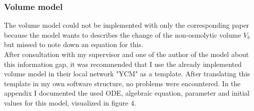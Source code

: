 \subsubsection{Volume model}
The volume model could not be implemented with only the corresponding paper because the model wants to describes the change of the non-osmolytic volume $V_b$ but missed to note down an equation for this.\\
After consultation with my supervisor and one of the author of the model about this information gap, it was recommended that I use the already implemented volume model in their local network "YCM" as a template. After translating this template in my own software structure, no problems were encountered. In the appendix I documented the used ODE, algebraic equation, parameter and initial values for this model, visualized in figure 4. \newpage
